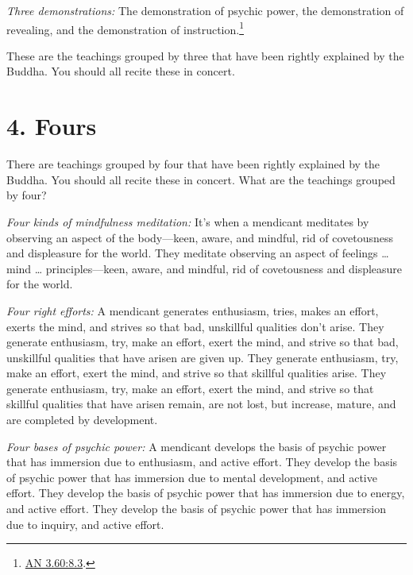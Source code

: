 \documentclass[12pt,openany]{book}%
\begin{document}
\emph{Three demonstrations:} The demonstration of psychic power, the demonstration of revealing, and the demonstration of instruction.\footnote{\href{https://suttacentral.net/an3.60/en/sujato\#8.3}{AN 3.60:8.3}. } 

These are the teachings grouped by three that have been rightly explained by the Buddha. You should all recite these in concert. 

\section*{4. Fours }

There are teachings grouped by four that have been rightly explained by the Buddha. You should all recite these in concert. What are the teachings grouped by four? 

\emph{Four kinds of mindfulness meditation:} It’s when a mendicant meditates by observing an aspect of the body—keen, aware, and mindful, rid of covetousness and displeasure for the world. They meditate observing an aspect of feelings … mind … principles—keen, aware, and mindful, rid of covetousness and displeasure for the world. 

\emph{Four right efforts:} A mendicant generates enthusiasm, tries, makes an effort, exerts the mind, and strives so that bad, unskillful qualities don’t arise. They generate enthusiasm, try, make an effort, exert the mind, and strive so that bad, unskillful qualities that have arisen are given up. They generate enthusiasm, try, make an effort, exert the mind, and strive so that skillful qualities arise. They generate enthusiasm, try, make an effort, exert the mind, and strive so that skillful qualities that have arisen remain, are not lost, but increase, mature, and are completed by development. 

\emph{Four bases of psychic power:} A mendicant develops the basis of psychic power that has immersion due to enthusiasm, and active effort. They develop the basis of psychic power that has immersion due to mental development, and active effort. They develop the basis of psychic power that has immersion due to energy, and active effort. They develop the basis of psychic power that has immersion due to inquiry, and active effort. 
\end{document}
